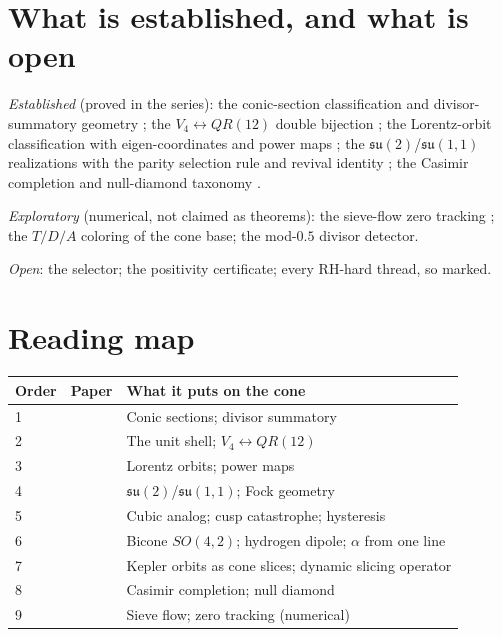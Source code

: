 \documentclass[11pt]{amsart}
\theoremstyle{remark}
\begin{document}
\section{What is established, and what is open}

\emph{Established} (proved in the series): the conic-section
classification and divisor-summatory geometry \cite{Ebert2026Table};
the $V_4\leftrightarrow QR(12)$ double bijection
\cite{Ebert2026Totient}; the Lorentz-orbit classification with
eigen-coordinates and power maps \cite{Ebert2026EigenCoord}; the
$\mathfrak{su}(2)$/$\mathfrak{su}(1,1)$ realizations with the parity
selection rule and revival identity \cite{Ebert2026Quantum}; the
Casimir completion and null-diamond taxonomy
\cite{Ebert2026NullDiamond}.

\emph{Exploratory} (numerical, not claimed as theorems): the
sieve-flow zero tracking \cite{Ebert2026Sieve}; the $T/D/A$ coloring of
the cone base; the mod-$0.5$ divisor detector.

\emph{Open}: the selector; the positivity certificate; every RH-hard
thread, so marked.

\section{Reading map}

\begin{center}
\begin{tabular}{lll}
Order & Paper & What it puts on the cone \\
\hline
1 & \cite{Ebert2026Table} & Conic sections; divisor summatory \\
2 & \cite{Ebert2026Totient} & The unit shell; $V_4\leftrightarrow QR(12)$ \\
3 & \cite{Ebert2026EigenCoord} & Lorentz orbits; power maps \\
4 & \cite{Ebert2026Quantum} & $\mathfrak{su}(2)$/$\mathfrak{su}(1,1)$; Fock geometry \\
5 & \cite{Ebert2026Cusp} & Cubic analog; cusp catastrophe; hysteresis \\
6 & \cite{Ebert2026Bicone} & Bicone $SO(4,2)$; hydrogen dipole; $\alpha$ from one line \\
7 & \cite{Ebert2026Kepler} & Kepler orbits as cone slices; dynamic slicing operator \\
8 & \cite{Ebert2026NullDiamond} & Casimir completion; null diamond \\
9 & \cite{Ebert2026Sieve} & Sieve flow; zero tracking (numerical) \\
\hline
\end{tabular}
\end{center}
\end{document}
